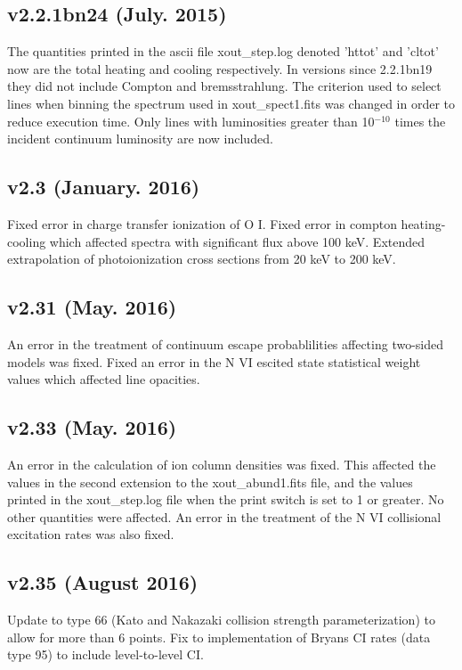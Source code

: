 \subsection{v2.2.1bn24 (July. 2015)}

The quantities printed in the ascii file xout\_step.log denoted 'httot' and 'cltot'
now are the total heating and cooling respectively.  In versions since
2.2.1bn19 they did not include Compton and bremsstrahlung.  
The criterion used to select lines when binning the spectrum used in 
 xout\_spect1.fits was changed in order to reduce execution time.  
Only lines with luminosities greater than 10$^{-10}$ times
the incident continuum luminosity are now included.
 
\subsection{v2.3 (January. 2016)}

Fixed error in charge transfer ionization of O I.  Fixed error in compton heating-cooling
which affected spectra with significant flux above 100 keV.  Extended extrapolation of photoionization 
cross sections from 20 keV to 200 keV.

\subsection{v2.31 (May. 2016)}

An error in the treatment of continuum escape probablilities affecting two-sided models was fixed.
Fixed an error in the N VI escited state statistical weight values which affected line opacities.

\subsection{v2.33 (May. 2016)}

An error in the calculation of ion column densities was fixed.  This affected the values in the second 
extension to the xout\_abund1.fits file, and the values printed in the xout\_step.log file when
the print switch is set to 1 or greater.  No other quantities were affected.
An error in the treatment of the N VI collisional excitation rates was also fixed.

\subsection{v2.35 (August 2016)}

Update to type 66 (Kato and Nakazaki collision strength parameterization) to allow for more than 6 points.
Fix to implementation of Bryans CI rates (data type 95) to include level-to-level CI.

